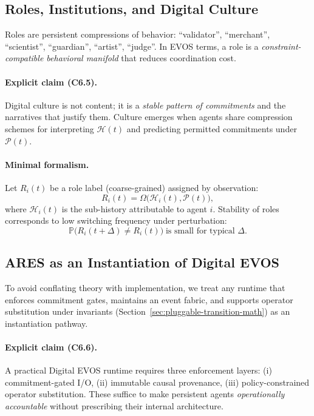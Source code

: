 \documentclass[11pt]{article}
\begin{document}
\subsection{Roles, Institutions, and Digital Culture}
\label{sec:roles-institutions-culture}

Roles are persistent compressions of behavior: ``validator'', ``merchant'', ``scientist'',
``guardian'', ``artist'', ``judge''. In EVOS terms, a role is a \emph{constraint-compatible
behavioral manifold} that reduces coordination cost.

\paragraph{Explicit claim (C6.5).}
Digital culture is not content; it is a \emph{stable pattern of commitments} and the narratives
that justify them. Culture emerges when agents share compression schemes for interpreting
$\mathcal{H}(t)$ and predicting permitted commitments under $\mathcal{P}(t)$.

\paragraph{Minimal formalism.}
Let $R_i(t)$ be a role label (coarse-grained) assigned by observation:
\[
R_i(t) = \Omega\big(\mathcal{H}_i(t), \mathcal{P}(t)\big),
\]
where $\mathcal{H}_i(t)$ is the sub-history attributable to agent $i$.
Stability of roles corresponds to low switching frequency under perturbation:
\[
\mathbb{P}\big(R_i(t+\Delta)\neq R_i(t)\big) \;\text{is small for typical }\Delta.
\]

\subsection{ARES as an Instantiation of Digital EVOS}
\label{sec:ares-instantiation}

To avoid conflating theory with implementation, we treat any runtime that enforces
commitment gates, maintains an event fabric, and supports operator substitution under
invariants (Section~\ref{sec:pluggable-transition-math}) as an instantiation pathway.

\paragraph{Explicit claim (C6.6).}
A practical Digital EVOS runtime requires three enforcement layers:
(i) commitment-gated I/O, (ii) immutable causal provenance, (iii) policy-constrained
operator substitution. These suffice to make persistent agents \emph{operationally accountable}
without prescribing their internal architecture.
\end{document}
